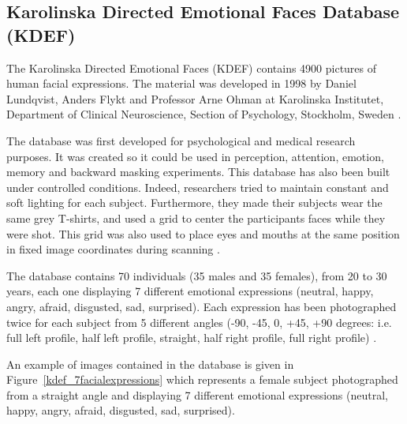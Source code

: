\subsection{Karolinska Directed Emotional Faces Database (KDEF)}

\vspace{\baselineskip}
\noindent The Karolinska Directed Emotional Faces (KDEF) contains 4900 pictures of human facial expressions. The material was developed in 1998 by Daniel Lundqvist, Anders Flykt and Professor Arne Ohman at Karolinska Institutet, Department of Clinical Neuroscience, Section of Psychology, Stockholm, Sweden \cite{KDEF}.
\newline

\noindent The database was first developed for psychological and medical research purposes. It was created so it could be used in perception, attention, emotion, memory and backward masking experiments. This database has also been built under controlled conditions. Indeed, researchers tried to maintain constant and soft lighting for each subject. Furthermore, they made their subjects wear the same grey T-shirts, and used a grid to center the participants faces while they were shot. This grid was also used to place eyes and mouths at the same position in fixed image coordinates during scanning \cite{KDEF}.
\newline

\noindent The database contains 70 individuals (35 males and 35 females), from 20 to 30 years, each one displaying 7 different emotional expressions (neutral, happy, angry, afraid, disgusted, sad, surprised). Each expression has been photographed twice for each subject from 5 different angles (-90, -45, 0, +45, +90 degrees: i.e. full left profile, half left profile, straight, half right profile, full right profile)  \cite{KDEF}.
\newline

\noindent An example of images contained in the database is given in Figure~\ref{kdef_7facialexpressions} which represents a female subject photographed from a straight angle and displaying 7 different emotional expressions (neutral, happy, angry, afraid, disgusted, sad, surprised).
\newline

